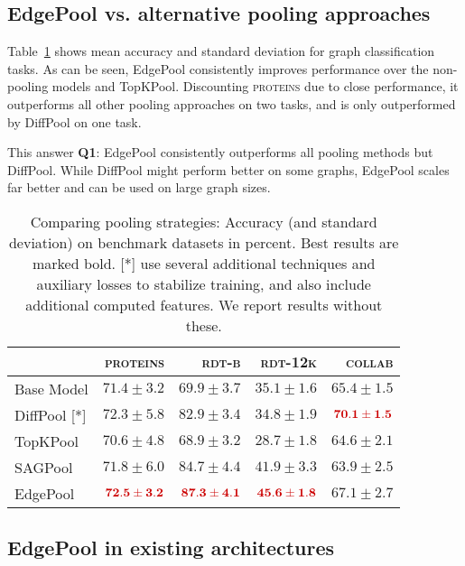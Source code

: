 \documentclass{article}
\newcommand{\tableref}[1]{Table~\ref{#1}}
\newcommand{\edgepool}{EdgePool}
\newcommand{\datasetname}[1]{\textsc{#1}}
\newcommand{\proteins}{\datasetname{proteins}}
\newcommand{\best}[1]{\mathbf{\textcolor{bestcolor}{#1}}}
\begin{document}
\subsection{\edgepool{} vs. alternative pooling approaches}

\tableref{tab:results_pooling} shows mean accuracy and standard deviation for graph classification tasks. As can be seen, \edgepool{} consistently improves performance over the non-pooling models and TopKPool. Discounting \proteins{} due to close performance, it outperforms all other pooling approaches on two tasks, and is only outperformed by DiffPool on one task.

This answer \textbf{Q1}: \edgepool{} consistently outperforms all pooling methods but DiffPool. While DiffPool might perform better on some graphs, \edgepool{} scales far better and can be used on large graph sizes.

\begin{table}
	\centering
	
\caption{Comparing pooling strategies: Accuracy (and standard deviation) on benchmark datasets in percent. Best results are marked bold. [*] \citet{yingHierarchicalGraphRepresentation2018} use several additional techniques and auxiliary losses to stabilize training, and also include additional computed features. We report results without these.} 

\begin{tabular}{lrrrr}
	\toprule
	                   & \textbf{\datasetname{proteins}} & \textbf{\datasetname{rdt-b}} & \textbf{\datasetname{rdt-12k}} & \textbf{\datasetname{collab}}\\ \midrule
	Base Model         & $71.4\pm 3.2$ 			& $69.9\pm 3.7$ 		& $35.1\pm 1.6$ 		& $65.4\pm 1.5$ \\
	DiffPool [*]       & $72.3\pm 5.8$ 	        & $82.9\pm 3.4$ 		& $34.8\pm 1.9$ 		& $\best{70.1\pm 1.5}$\\
	TopKPool           & $70.6\pm 4.8$ 			& $68.9\pm 3.2$ 		& $28.7\pm 1.8$ 		& $64.6\pm 2.1$\\
	SAGPool            & $71.8\pm 6.0$ 			& $84.7\pm 4.4$ 		& $41.9\pm 3.3$ 		& $63.9\pm 2.5$\\
	\edgepool{}        & $\best{72.5\pm 3.2}$ 			& $\best{87.3\pm 4.1}$ 	        & $\best{45.6\pm 1.8}$ 	& $67.1 \pm 2.7$ \\\bottomrule
\end{tabular} 	\label{tab:results_pooling}
\end{table}

\subsection{\edgepool{} in existing architectures}
\end{document}
